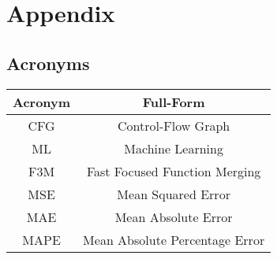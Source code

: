 \chapter{Appendix}
\section{Acronyms}

\begin{center}
\begin{tabular}{ |c|c| } 
 \hline
 \textbf{Acronym} & \textbf{Full-Form} \\ 
 \hline
 CFG & Control-Flow Graph \\ 
 ML & Machine Learning \\
 F3M & Fast Focused Function Merging\\
  MSE & Mean Squared Error\\
  MAE & Mean Absolute Error\\
  MAPE & Mean Absolute Percentage Error\\
 \hline
\end{tabular}
\end{center}